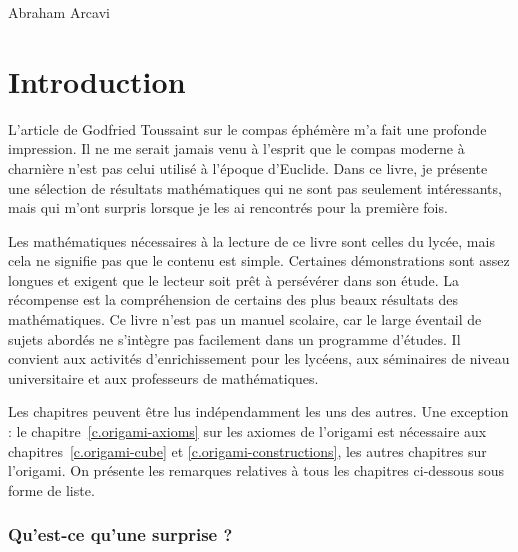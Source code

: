 \vspace{-0.75cm}

\vspace{\baselineskip}
\begin{flushright}
{Abraham Arcavi}
\end{flushright}

\newpage

\rhead[\fancyplain{}{}]%
{\fancyplain{}{\thepage}}
\cfoot{}
\pagestyle{fancyplain}

\chapter*{Introduction}

L'article de Godfried Toussaint sur le \og compas éphémère\fg{}  \cite{toussaint} m'a fait une profonde impression. Il ne me serait jamais venu à l'esprit que le compas moderne à charnière n'est pas celui utilisé à l'époque d'Euclide. Dans ce livre, je présente une sélection de résultats mathématiques qui ne sont pas seulement intéressants, mais qui m'ont surpris lorsque je les ai rencontrés pour la première fois.

Les mathématiques nécessaires à la lecture de ce livre sont celles du lycée, mais cela ne signifie pas que le contenu est simple. Certaines démonstrations sont assez longues et exigent que le lecteur soit prêt à persévérer dans son étude. La récompense est la compréhension de certains des plus beaux résultats des mathématiques. Ce livre n'est pas un manuel scolaire, car le large éventail de sujets abordés ne s'intègre pas facilement dans un programme d'études. Il convient aux activités d'enrichissement pour les  lycéens, aux séminaires de niveau universitaire et aux professeurs de mathématiques.

 Les chapitres peuvent être lus indépendamment les uns des autres. Une exception : le chapitre~\ref{c.origami-axioms} sur les axiomes de l'origami est nécessaire aux chapitres~\ref{c.origami-cube} et \ref{c.origami-constructions}, les autres chapitres sur l'origami. On présente les remarques relatives à tous les chapitres ci-dessous sous forme de liste.

\subsection*{Qu'est-ce qu'une surprise ?}

